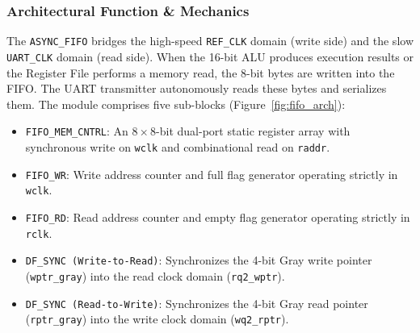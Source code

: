 \documentclass[11pt,a4paper]{article}
\begin{document}
\subsubsection{Architectural Function \& Mechanics}
The \texttt{ASYNC\_FIFO} bridges the high-speed \texttt{REF\_CLK} domain (write side) and the slow \texttt{UART\_CLK} domain (read side). When the 16-bit ALU produces execution results or the Register File performs a memory read, the 8-bit bytes are written into the FIFO. The UART transmitter autonomously reads these bytes and serializes them. The module comprises five sub-blocks (Figure~\ref{fig:fifo_arch}):
\begin{itemize}
    \item \texttt{FIFO\_MEM\_CNTRL}: An $8\times 8$-bit dual-port static register array with synchronous write on \texttt{wclk} and combinational read on \texttt{raddr}.
    \item \texttt{FIFO\_WR}: Write address counter and full flag generator operating strictly in \texttt{wclk}.
    \item \texttt{FIFO\_RD}: Read address counter and empty flag generator operating strictly in \texttt{rclk}.
    \item \texttt{DF\_SYNC (Write-to-Read)}: Synchronizes the 4-bit Gray write pointer (\texttt{wptr\_gray}) into the read clock domain (\texttt{rq2\_wptr}).
    \item \texttt{DF\_SYNC (Read-to-Write)}: Synchronizes the 4-bit Gray read pointer (\texttt{rptr\_gray}) into the write clock domain (\texttt{wq2\_rptr}).
\end{itemize}
\end{document}
